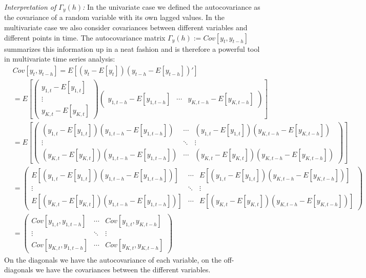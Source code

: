 \begin{enumerate}
\emph{Interpretation of \(\Gamma_y(h)\):}
In the univariate case we defined the autocovariance as the covariance of a random variable with its own lagged values.
In the multivariate case we also consider covariances between different variables and different points in time.
The autocovariance matrix \({\Gamma_y(h)} := Cov[{y_{t},{y_{t-h}}}]\) summarizes this information up in a neat fashion
and is therefore a powerful tool in multivariate time series analysis:
\begin{align*}
&Cov[{y_{t},{y_{t-h}}}] = E\left[({y_{t}}-E[{{y_{t}}}]) ({y_{t-h}}-E[{{y_{t-h}}}])' \right]\\
&= E\left[\begin{pmatrix}y_{1,t} - E[y_{1,t}] \\ \vdots \\ y_{K,t} - E[y_{K,t}] \end{pmatrix} \begin{pmatrix} y_{1,{t-h}} - E[y_{1,{t-h}}] & \cdots & y_{K,{t-h}} - E[y_{K,{t-h}}]  \end{pmatrix} \right]\\
&= E\left[\begin{pmatrix}
(y_{1,t}- E[y_{1,t}])(y_{1,{t-h}} - E[y_{1,{t-h}}]) & \cdots & (y_{1,t} - E[y_{1,t}])(y_{K,{t-h}} - E[y_{K,{t-h}}])\\
\vdots & \ddots & \vdots \\
(y_{K,t}- E[y_{K,t}])(y_{1,{t-h}} - E[y_{1,{t-h}}]) & \cdots & (y_{K,t} - E[y_{K,t}])(y_{K,{t-h}} - E[y_{K,{t-h}}])
\end{pmatrix} \right]\\
&= \begin{pmatrix}
E[(y_{1,t}- E[y_{1,t}])(y_{1,{t-h}} - E[y_{1,{t-h}}])] & \cdots & E[(y_{1,t} - E[y_{1,t}])(y_{K,{t-h}} - E[y_{K,{t-h}}])]\\
\vdots & \ddots & \vdots\\
E[(y_{K,t}- E[y_{K,t}])(y_{1,{t-h}} - E[y_{1,{t-h}}])] & \cdots & E[(y_{K,t} - E[y_{K,t}])(y_{K,{t-h}} - E[y_{K,{t-h}}])]
\end{pmatrix}\\
&=\begin{pmatrix}
Cov[y_{1,t},y_{1,{t-h}}] & \cdots & Cov[y_{1,t},y_{K,{t-h}}]\\
\vdots & \ddots & \vdots\\
Cov[y_{K,t},y_{1,{t-h}}] & \cdots & Cov[y_{K,t},y_{K,{t-h}}]
\end{pmatrix}
\end{align*}
On the diagonals we have the autocovariance of each variable,
  on the off-diagonals we have the covariances between the different variables.
	

\end{enumerate}
